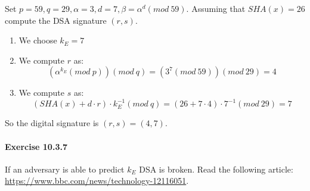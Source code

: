 \documentclass{article}
\begin{document}
	Set $p = 59, q = 29, \alpha = 3, d = 7, \beta = \alpha^{d} (mod ~ 59)$.
	Assuming that $SHA(x) = 26$ compute the DSA signature $(r, s)$.

	\vspace{20pt}

	\begin{enumerate}
		\item We choose $k_{E} = 7$
		\item We compute $r$ as:
			$$
				(\alpha^{k_{E}}(mod ~ p)) (mod ~ q) = 
				(3^{7} (mod ~ 59)) (mod ~ 29) = 4
			$$
		\item We compute $s$ as:
			$$
				(SHA(x) + d\cdot r) \cdot k_{E}^{-1} (mod ~ q) = 
				(26 + 7 \cdot 4) \cdot 7^{-1} (mod ~ 29) = 
				7
			$$
	\end{enumerate}

	So the digital signature is $(r, s) = (4, 7)$.

	\paragraph{Exercise 10.3.7}

	If an adversary is able to predict $k_{E}$ DSA is broken. Read the following
	article: \url{https://www.bbc.com/news/technology-12116051}.
\end{document}

